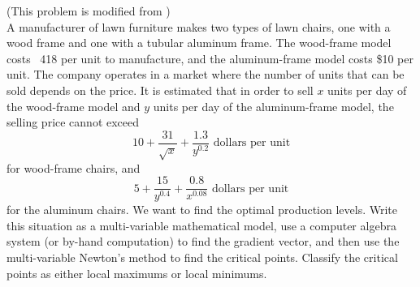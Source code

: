 \begin{problem}\label{prob:lawn_chair}
    (This problem is modified from \cite{Meerschaert}) \\
    A manufacturer of lawn furniture makes two types of lawn chairs, one with a wood
    frame and one with a tubular aluminum frame.  The wood-frame model costs \
    418 per unit to manufacture, and the aluminum-frame model costs \$10 per unit.  The
    company operates in a market where the number of units that can be sold depends on the
    price.  It is estimated that in order to sell $x$ units per day of the wood-frame
    model and $y$ units per day of the aluminum-frame model, the selling price cannot
    exceed 
    \[ 10 + \frac{31}{\sqrt{x}} + \frac{1.3}{y^{0.2}} \text{ dollars per unit} \]
    for wood-frame chairs, and 
    \[ 5 + \frac{15}{y^{0.4}} + \frac{0.8}{x^{0.08}} \text{ dollars per unit} \]
    for the aluminum chairs.  We want to find the optimal production levels.  Write this
    situation as a multi-variable mathematical model, use a computer
    algebra system (or by-hand computation) to find the gradient vector, and then use the
    multi-variable Newton's method to find the critical points.  Classify the critical
    points as either local maximums or local minimums.
\end{problem}



